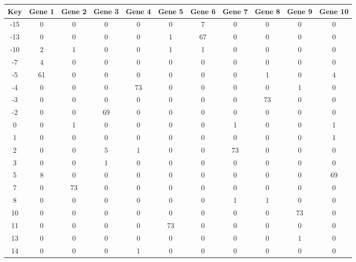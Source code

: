\begin{tabular}{|c|c|c|c|c|c|c|c|c|c|c|}
\hline
Key & Gene 1 & Gene 2 & Gene 3 & Gene 4 & Gene 5 & Gene 6 & Gene 7 & Gene 8 & Gene 9 & Gene 10 \\
\hline
-15 & 0 & 0 & 0 & 0 & 0 & 7 & 0 & 0 & 0 & 0 \\
-13 & 0 & 0 & 0 & 0 & 1 & 67 & 0 & 0 & 0 & 0 \\
-10 & 2 & 1 & 0 & 0 & 1 & 1 & 0 & 0 & 0 & 0 \\
-7 & 4 & 0 & 0 & 0 & 0 & 0 & 0 & 0 & 0 & 0 \\
-5 & 61 & 0 & 0 & 0 & 0 & 0 & 0 & 1 & 0 & 4 \\
-4 & 0 & 0 & 0 & 73 & 0 & 0 & 0 & 0 & 1 & 0 \\
-3 & 0 & 0 & 0 & 0 & 0 & 0 & 0 & 73 & 0 & 0 \\
-2 & 0 & 0 & 69 & 0 & 0 & 0 & 0 & 0 & 0 & 0 \\
0 & 0 & 1 & 0 & 0 & 0 & 0 & 1 & 0 & 0 & 1 \\
1 & 0 & 0 & 0 & 0 & 0 & 0 & 0 & 0 & 0 & 1 \\
2 & 0 & 0 & 5 & 1 & 0 & 0 & 73 & 0 & 0 & 0 \\
3 & 0 & 0 & 1 & 0 & 0 & 0 & 0 & 0 & 0 & 0 \\
5 & 8 & 0 & 0 & 0 & 0 & 0 & 0 & 0 & 0 & 69 \\
7 & 0 & 73 & 0 & 0 & 0 & 0 & 0 & 0 & 0 & 0 \\
8 & 0 & 0 & 0 & 0 & 0 & 0 & 1 & 1 & 0 & 0 \\
10 & 0 & 0 & 0 & 0 & 0 & 0 & 0 & 0 & 73 & 0 \\
11 & 0 & 0 & 0 & 0 & 73 & 0 & 0 & 0 & 0 & 0 \\
13 & 0 & 0 & 0 & 0 & 0 & 0 & 0 & 0 & 1 & 0 \\
14 & 0 & 0 & 0 & 1 & 0 & 0 & 0 & 0 & 0 & 0 \\
\hline
\end{tabular}